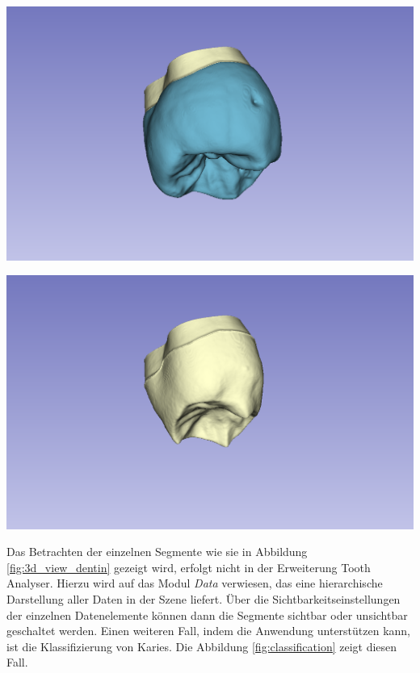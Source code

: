 \begin{minipage}{0.45\textwidth}
	\centering
	\includegraphics[scale=0.2, width=\textwidth]{img/3dView.png}
	\label{fig:3d_view}
\end{minipage}
\hfill
\begin{minipage}{0.45\textwidth}
	\centering
	\includegraphics[scale=0.2, width=\textwidth]{img/3dViewDentin.png}
	\label{fig:3d_view_dentin}
\end{minipage}

Das Betrachten der einzelnen Segmente wie sie in Abbildung \ref{fig:3d_view_dentin}
gezeigt wird, erfolgt nicht in der Erweiterung Tooth Analyser. Hierzu wird auf das
Modul \textit{Data} verwiesen, das eine hierarchische Darstellung aller Daten in
der Szene liefert. Über die Sichtbarkeitseinstellungen der einzelnen
Datenelemente können dann die Segmente sichtbar oder unsichtbar geschaltet
werden. Einen weiteren Fall, indem die Anwendung unterstützen kann, ist die Klassifizierung
von Karies. Die Abbildung \ref{fig:classification} zeigt diesen Fall.

